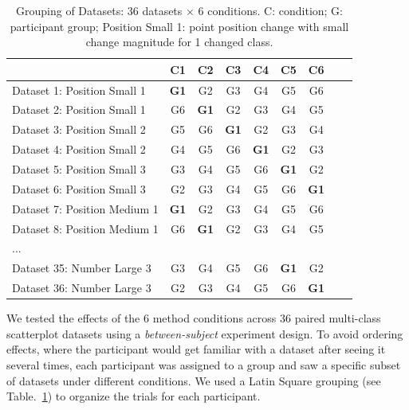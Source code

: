 \begin{table}[ht]
     \renewcommand\arraystretch{1}
     \centering
     \caption{Grouping of Datasets: $36$ datasets $\times$ $6$ conditions. C: condition; G: participant group; Position Small 1: point position change with small change magnitude for 1 changed class.}
     \label{tab:latinsquare}
     \begin{tabular}{lcccccccc}
     \hline
      & C1 & C2 & C3  & C4 & C5 & C6 \\

     \hline
     Dataset 1: Position Small 1 & \textbf{G1} & G2 & G3  & G4 & G5 & G6 \\
     Dataset 2: Position Small 1 & G6 & \textbf{G1} & G2 & G3  & G4 & G5 \\
     Dataset 3: Position Small 2 & G5  & G6 & \textbf{G1} & G2 & G3 & G4 \\
     Dataset 4: Position Small 2 & G4 & G5  & G6 & \textbf{G1} & G2 & G3 \\
     Dataset 5: Position Small 3 & G3 & G4 & G5  & G6 & \textbf{G1} & G2 \\
     Dataset 6: Position Small 3 & G2 & G3 & G4  & G5 & G6 & \textbf{G1} \\
     Dataset 7: Position Medium 1 & \textbf{G1} & G2 & G3  & G4 & G5 & G6 \\
     Dataset 8: Position Medium 1 & G6 & \textbf{G1} & G2 & G3  & G4 & G5 \\
     ... & & & & & & &\\
     Dataset 35: Number Large 3 & G3 & G4 & G5  & G6 & \textbf{G1} & G2 \\
     Dataset 36: Number Large 3 & G2 & G3  & G4 & G5 & G6 & \textbf{G1}  \\

     \hline
     \end{tabular}
     \end{table}


\vspace{.3em}
 We tested the effects of the $6$ method conditions across $36$ paired multi-class scatterplot datasets using a \emph{between-subject} experiment design. To avoid ordering effects, where the participant would get familiar with a dataset after seeing it several times, each participant was assigned to a group and saw a specific subset of datasets under different conditions. We used a Latin Square grouping (see Table.~\ref{tab:latinsquare}) to organize the trials for each participant. %


